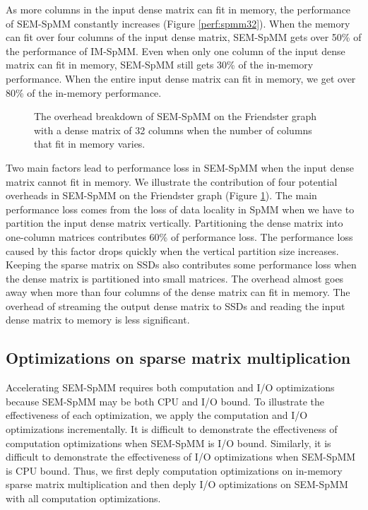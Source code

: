 As more columns in the input dense matrix can fit in memory, the performance
of SEM-SpMM constantly increases (Figure \ref{perf:spmm32}). When the memory
can fit over four columns of the input dense matrix, SEM-SpMM gets over 50\%
of the performance of IM-SpMM. Even when only one column of the input dense
matrix can fit in memory, SEM-SpMM still gets 30\% of the in-memory
performance. When the entire input dense matrix can fit in memory, we get over
80\% of the in-memory performance.

\begin{figure}
	\begin{center}
		\footnotesize
		
		\caption{The overhead breakdown of SEM-SpMM on the Friendster
			graph with a dense matrix of 32 columns when the number
			of columns that fit in memory varies. }
		\label{perf:spmm32_over}
	\end{center}
\end{figure}

Two main factors lead to performance loss in SEM-SpMM when the input dense matrix
cannot fit in memory. We illustrate the contribution of four potential overheads
in SEM-SpMM on the Friendster graph (Figure \ref{perf:spmm32_over}). The main
performance loss comes from the loss of data locality in SpMM when we have to
partition the input dense matrix vertically.
Partitioning the dense matrix into one-column matrices contributes 60\%
of performance loss. The performance loss caused by this factor drops quickly
when the vertical partition size increases. Keeping the sparse matrix on SSDs
also contributes some performance loss when the dense matrix is partitioned
into small matrices. The overhead almost goes away when more than four columns
of the dense matrix can fit in memory. The overhead of streaming the output dense
matrix to SSDs and reading the input dense matrix to memory is less significant.

\subsection{Optimizations on sparse matrix multiplication}
Accelerating SEM-SpMM requires both computation and I/O optimizations because
SEM-SpMM may be both CPU and I/O bound. To illustrate the effectiveness of
each optimization, we apply the computation and I/O optimizations
incrementally. It is difficult to demonstrate the effectiveness of computation
optimizations when SEM-SpMM is I/O bound. Similarly, it is difficult to demonstrate
the effectiveness of I/O optimizations when SEM-SpMM is CPU bound. Thus, we first
deply computation optimizations on in-memory sparse matrix multiplication and then
deply I/O optimizations on SEM-SpMM with all computation optimizations.

